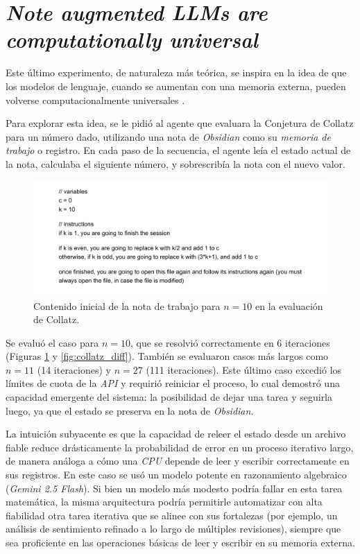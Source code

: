 \section{\textit{Note augmented LLMs are computationally universal}}
Este último experimento, de naturaleza más teórica, se inspira en la idea de que los modelos de lenguaje, cuando se aumentan con una memoria externa, pueden volverse computacionalmente universales \parencite{schuurmansMemoryAugmentedLarge2023}.

Para explorar esta idea, se le pidió al agente que evaluara la Conjetura de Collatz para un número dado, utilizando una nota de \textit{Obsidian} como su \textit{memoria de trabajo} o registro. En cada paso de la secuencia, el agente leía el estado actual de la nota, calculaba el siguiente número, y sobrescribía la nota con el nuevo valor.

\begin{figure}[h]
    \centering
    \includegraphics[width=1.0\textwidth]{figures/collatz_init_10.pdf}
    \caption{Contenido inicial de la nota de trabajo para $n=10$ en la evaluación de Collatz.}
    \label{fig:collatz_code}
\end{figure}

Se evaluó el caso para $n=10$, que se resolvió correctamente en 6 iteraciones (Figuras \ref{fig:collatz_code} y \ref{fig:collatz_diff}). También se evaluaron casos más largos como $n=11$ (14 iteraciones) y $n=27$ (111 iteraciones). Este último caso excedió los límites de cuota de la \textit{API} y requirió reiniciar el proceso, lo cual demostró una capacidad emergente del sistema: la posibilidad de dejar una tarea y seguirla luego, ya que el estado se preserva en la nota de \textit{Obsidian}.

La intuición subyacente es que la capacidad de releer el estado desde un archivo fiable reduce drásticamente la probabilidad de error en un proceso iterativo largo, de manera análoga a cómo una \textit{CPU} depende de leer y escribir correctamente en sus registros. En este caso se usó un modelo potente en razonamiento algebraico (\textit{Gemini 2.5 Flash}). Si bien un modelo más modesto podría fallar en esta tarea matemática, la misma arquitectura podría permitirle automatizar con alta fiabilidad otra tarea iterativa que se alinee con sus fortalezas (por ejemplo, un análisis de sentimiento refinado a lo largo de múltiples revisiones), siempre que sea proficiente en las operaciones básicas de leer y escribir en su memoria externa.

